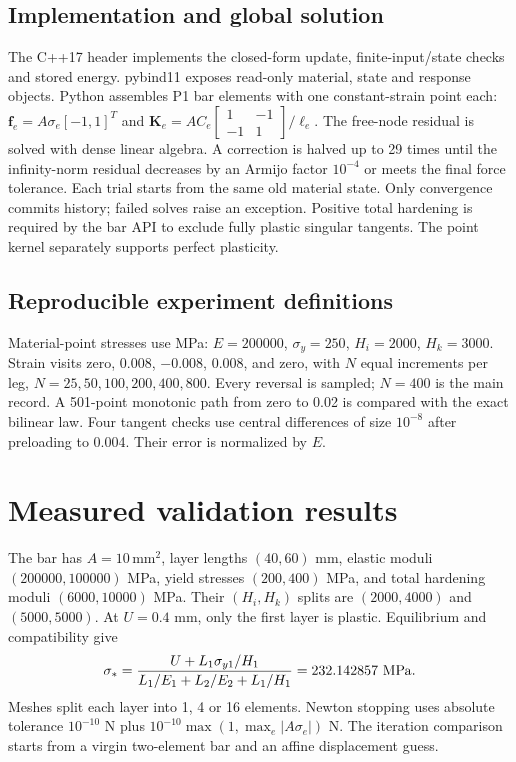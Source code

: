 \documentclass[11pt,a4paper]{article}
\begin{document}
\subsection{Implementation and global solution}
The C++17 header implements the closed-form update, finite-input/state checks and
stored energy. pybind11 exposes read-only material, state and response objects.
Python assembles P1 bar elements with one constant-strain point each:
$\mathbf f_e=A\sigma_e[-1,1]^T$ and
$\mathbf K_e=AC_e\left[\begin{smallmatrix}1&-1\\-1&1\end{smallmatrix}\right]/\ell_e$.
The free-node residual is solved with dense linear algebra. A correction is halved
up to 29 times until the infinity-norm residual decreases by an Armijo factor
$10^{-4}$ or meets the final force tolerance. Each trial starts from the same old
material state. Only convergence commits history; failed solves raise an exception.
Positive total hardening is required by the bar API to exclude fully plastic singular
tangents. The point kernel separately supports perfect plasticity.

\subsection{Reproducible experiment definitions}
Material-point stresses use MPa: $E=200000$, $\sigma_y=250$, $H_i=2000$, $H_k=3000$.
Strain visits zero, 0.008, $-0.008$, 0.008, and zero, with $N$ equal increments
per leg, $N=25,50,100,200,400,800$. Every reversal is sampled; $N=400$ is the main
record. A 501-point monotonic path from zero to 0.02 is compared with the exact
bilinear law. Four tangent checks use central differences of size $10^{-8}$ after
preloading to 0.004. Their error is normalized by $E$.

\newpage
\section{Measured validation results}
The bar has $A=10\,\mathrm{mm}^2$, layer lengths $(40,60)$ mm, elastic moduli
$(200000,100000)$ MPa, yield stresses $(200,400)$ MPa, and total hardening moduli
$(6000,10000)$ MPa. Their $(H_i,H_k)$ splits are $(2000,4000)$ and $(5000,5000)$.
At $U=0.4$ mm, only the first layer is plastic. Equilibrium and compatibility give
\begin{equation}
 \sigma_* = \frac{U+L_1\sigma_{y1}/H_1}
 {L_1/E_1+L_2/E_2+L_1/H_1}=\BarStress\ \mathrm{MPa}.\label{eq:bar}
\end{equation}
Meshes split each layer into 1, 4 or 16 elements. Newton stopping uses absolute
tolerance $10^{-10}$ N plus $10^{-10}\max(1,\max_e|A\sigma_e|)$ N. The iteration
comparison starts from a virgin two-element bar and an affine displacement guess.
\end{document}
